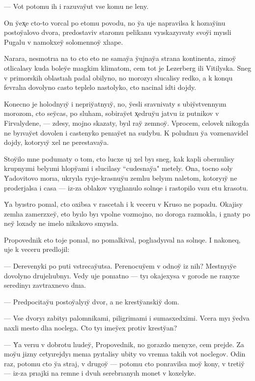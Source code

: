 \documentclass[10pt]{book}
\begin{document}
— Vot potomu ih i razuvay̆ut vse komu ne leny.

On y̆ex̨e cto-to vorcal po etomu povodu, no y̆a uje napravilsa k hozıay̆inu postoy̆alovo dvora, predostaviv staromu pelikanu vyıskazyıvaty svoy̆i myısli Pugalu v namokxey̆ solomennoy̆ xlıape.



Narara, nesmotrıa na to cto eto ne samay̆a y̆ujnay̆a strana kontinenta, zimoy̆ otlicalasy kuda boley̆e mıagkim klimatom, cem tot je Lezerberg ili Vitilyska. Sneg v primorskih oblastıah padal obilyno, no morozyı slucalisy redko, a k konqu fevralıa dovolyno casto teplelo nastolyko, cto nacinal idti dojdy.

Konecno je holodnyıy̆ i nepriy̆atnyıy̆, no, y̆esli sravnivaty s ubiy̆stvennyım morozom, cto sey̆cas, po sluham, sobiray̆et x̨edruy̆u jatvu iz putnikov v Firvalydene, — zdesy, mojno skazaty, byıl ray̆ zemnoy̆. Vprocem, celovek nikogda ne byıvay̆et dovolen i castenyko penıay̆et na sudybu. K poludnıu y̆a voznenavidel dojdy, kotoryıy̆ xel ne perestavay̆a.

Stoy̆ilo mne podumaty o tom, cto lucxe uj xel byı sneg, kak kapli obernulisy krupnyımi belyımi hlopy̆ami i slucilasy ``cudesnay̆a" metely. Ona, tocno soly Y̆adovitovo morıa, ukryıla ryıje-krasnuy̆u zemlıu belyım naletom, kotoryıy̆ ne proderjalsa i casa — iz-za oblakov vyıglıanulo solnqe i rastopilo vsıu etu krasotu.

Y̆a byıstro ponıal, cto oxibsa v rascetah i k veceru v Kruso ne popadu. Okajisy zemlıa zamerzxey̆, eto byılo byı vpolne vozmojno, no doroga razmokla, i gnaty po ney̆ loxady ne imelo nikakovo smyısla.

Propovednik eto toje ponıal, no pomalkival, poglıadyıval na solnqe. I nakoneq, uje k veceru predlojil:

— Derevenyki po puti vstrecay̆utsa. Perenocuy̆em v odnoy̆ iz nih? Mestnyıy̆e dovolyno drujelıubnyı. Vedy uje ponıatno — tyı okajexysa v gorode ne ranyxe seredinyı zavtraxnevo dnıa.

— Predpocitay̆u postoy̆alyıy̆ dvor, a ne kresty̆anskiy̆ dom.

— Vse dvoryı zabityı palomnikami, piligrimami i sumasxedximi. Vcera myı y̆edva naxli mesto dlıa noclega. Cto tyı imey̆ex protiv kresty̆an?

— Y̆a verıu v dobrotu lıudey̆, Propovednik, no gorazdo menyxe, cem prejde. Za moy̆u jizny cetyırejdyı menıa pyıtalisy ubity vo vremıa takih vot noclegov. Odin raz, potomu cto y̆a straj, v drugoy̆ — potomu cto ponravilsa moy̆ kony, v tretiy̆ — iz-za prıajki na remne i dvuh serebrıanyıh monet v koxelyke.
\end{document}
